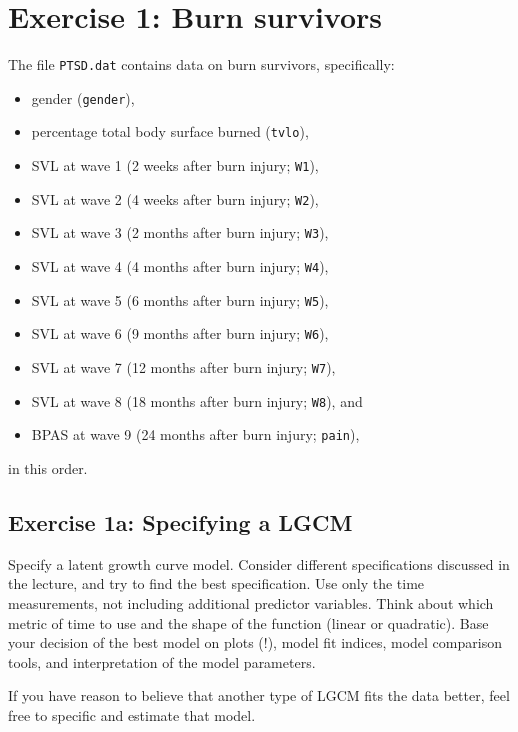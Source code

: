 \documentclass[
]{book}
\providecommand{\tightlist}{%
  \setlength{\itemsep}{0pt}\setlength{\parskip}{0pt}}
\begin{document}
\hypertarget{exercise-1-burn-survivors}{%
\section{Exercise 1: Burn survivors}\label{exercise-1-burn-survivors}}

The file \texttt{PTSD.dat} contains data on burn survivors, specifically:

\begin{itemize}
\tightlist
\item
  gender (\texttt{gender}),
\item
  percentage total body surface burned (\texttt{tvlo}),
\item
  SVL at wave 1 (2 weeks after burn injury; \texttt{W1}),
\item
  SVL at wave 2 (4 weeks after burn injury; \texttt{W2}),
\item
  SVL at wave 3 (2 months after burn injury; \texttt{W3}),
\item
  SVL at wave 4 (4 months after burn injury; \texttt{W4}),
\item
  SVL at wave 5 (6 months after burn injury; \texttt{W5}),
\item
  SVL at wave 6 (9 months after burn injury; \texttt{W6}),
\item
  SVL at wave 7 (12 months after burn injury; \texttt{W7}),
\item
  SVL at wave 8 (18 months after burn injury; \texttt{W8}), and
\item
  BPAS at wave 9 (24 months after burn injury; \texttt{pain}),
\end{itemize}

in this order.

\hypertarget{exercise-1a-specifying-a-lgcm}{%
\subsection{Exercise 1a: Specifying a LGCM}\label{exercise-1a-specifying-a-lgcm}}

Specify a latent growth curve model. Consider different specifications discussed in the lecture, and try to find the best specification. Use only the time measurements, not including additional predictor variables. Think about which metric of time to use and the shape of the function (linear or quadratic). Base your decision of the best model on plots (!), model fit indices, model comparison tools, and interpretation of the model parameters.

If you have reason to believe that another type of LGCM fits the data better, feel free to specific and estimate that model.
\end{document}
